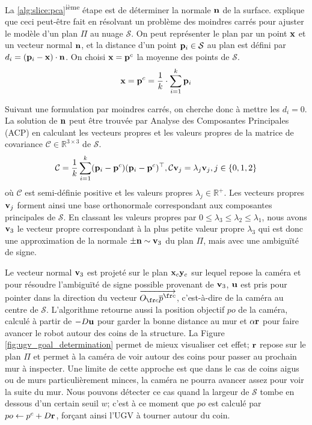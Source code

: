 La \ref{alg:slice:pca}\textsuperscript{ième} étape est de déterminer la normale $\mathbf{n}$ de la surface. \cite{Rusu2009} explique que ceci peut-être fait en résolvant un problème des moindres carrés pour ajuster le modèle d'un plan $\Pi$ au nuage $\mathcal{S}$. On peut représenter le plan par un point $\mathbf{x}$ et un vecteur normal $\mathbf{n}$, et la distance d'un point $\mathbf{p}_i \in \mathcal{S}$ au plan est défini par $d_i = (\mathbf{p}_i - \mathbf{x} ) \cdot \mathbf{n}$. On choisi $\mathbf{x} = \mathbf{p}^c$ la moyenne des points de $\mathcal{S}$.
\begin{align}
  \mathbf{x} = \mathbf{p}^c = \frac{1}{k} \cdot \sum^{k}_{i=1} \mathbf{p}_i
\end{align}

Suivant une formulation par moindres carrés, on cherche donc à mettre les $d_i = 0$. La solution de $\mathbf{n}$ peut être trouvée par Analyse des Composantes Principales (ACP) en calculant les vecteurs propres et les valeurs propres de la matrice de covariance $\mathcal{C} \in \mathbb{R}^{3\times 3}$ de $\mathcal{S}$.
\begin{align}
  \mathcal{C} = \frac{1}{k} \sum^{k}_{i=1} (\mathbf{p}_i - \mathbf{p}^c) (\mathbf{p}_i - \mathbf{p}^c)^\top, \mathcal{C} \mathbf{v}_j = \lambda_j \mathbf{v}_j, j \in \{0, 1, 2\}
\end{align}
où $\mathcal{C}$ est semi-définie positive et les valeurs propres $\lambda_j \in \mathbb{R}^+$. Les vecteurs propres $\mathbf{v}_j$ forment ainsi une base orthonormale correspondant aux composantes principales de $\mathcal{S}$. En classant les valeurs propres par $0 \leq \lambda_3 \leq \lambda_2 \leq \lambda_1$, nous avons $\mathbf{v}_3$ le vecteur propre correspondant à la plus petite valeur propre $\lambda_3$ qui est donc une approximation de la normale $\pm \mathbf{n} \sim \mathbf{v}_{3}$ du plan $\Pi$, mais avec une ambiguïté de signe.

Le vecteur normal $\mathbf{v}_3$ est projeté sur le plan $\mathbf{x}_c\mathbf{y}_c$ sur lequel repose la caméra et pour résoudre l'ambiguïté de signe possible provenant de $\mathbf{v}_3$, $\mathbf{u}$ est pris pour pointer dans la direction du vecteur $\overrightarrow{O_{\fr c} \overline{p}^{\fr c}}$, c'est-à-dire de la caméra au centre de $\mathcal{S}$. L'algorithme retourne aussi la position objectif ${po}$ de la caméra, calculé à partir de $-D\mathbf{u}$ pour garder la bonne distance au mur et $\alpha \mathbf{r}$ pour faire avancer le robot autour des coins de la structure. La Figure \ref{fig:ugv_goal_determination} permet de mieux visualiser cet effet; $\mathbf{r}$ repose sur le plan $\Pi$ et permet à la caméra de voir autour des coins pour passer au prochain mur à inspecter. Une limite de cette approche est que dans le cas de coins aigus ou de murs particulièrement minces, la caméra ne pourra avancer assez pour voir la suite du mur. Nous pouvons détecter ce cas quand la largeur de $\mathcal{S}$ tombe en dessous d'un certain seuil $w$; c'est à ce moment que ${po}$ est calculé par ${po} \gets p^c + D \mathbf{r}$, forçant ainsi l'UGV à tourner autour du coin.


